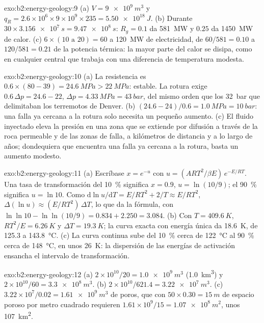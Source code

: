 \begin{solution}{exo:b2:energy-geology:9}
(a) $V = \qty{9e9}{m^3}$ y $q_R = 2.6 \times 10^6 \times 9 \times 10^9 \times 235 =
\qty{5.50e18}{J}$. (b) Durante $30 \times \qty{3.156e7}{s} = \qty{9.47e8}{s}$: $R_g = 0.1$ da
\qty{581}{MW} y $0.25$ da \qty{1450}{MW} de calor. (c) $6 \times (10 \text{ a } 20) = 60$ a
\qty{120}{MW} de electricidad, de $60/581 = 0.10$ a $120/581 = 0.21$ de la potencia térmica: la mayor parte del
calor se disipa, como en cualquier central que trabaja con una diferencia de temperatura modesta.
\end{solution}

\begin{solution}{exo:b2:energy-geology:10}
(a) La resistencia es $0.6 \times (80 - 39) = \qty{24.6}{MPa} > \qty{22}{MPa}$: estable. La rotura exige
$0.6\,\Delta p = 24.6 - 22$, $\Delta p = \qty{4.33}{MPa} = \qty{43}{bar}$, del mismo orden que los
\qty{32}{bar} que delimitaban los terremotos de Denver. (b) $(24.6 - 24)/0.6 = \qty{1.0}{MPa} =
\qty{10}{bar}$: una falla ya cercana a la rotura solo necesita un pequeño aumento. (c) El fluido inyectado eleva
la presión en una zona que se extiende por difusión a través de la roca permeable y de las zonas de falla, a kilómetros
de distancia y a lo largo de años; dondequiera que encuentra una falla ya cercana a la rotura, basta un aumento modesto.
\end{solution}

\begin{solution}{exo:b2:energy-geology:11}
(a) Escríbase $x = e^{-u}$ con $u = (ART^2/\beta E)\,e^{-E/RT}$. Una tasa de transformación del
\qty{10}{\percent} significa $x = 0.9$, $u = \ln(10/9)$; el \qty{90}{\percent} significa $u = \ln 10$. Como
$\mathrm{d}\ln u/\mathrm{d}T = E/RT^2 + 2/T \approx E/RT^2$, $\Delta(\ln u) \approx (E/RT^2)\,\Delta T$,
lo que da la fórmula, con $\ln\ln 10 - \ln\ln(10/9) = 0.834 + 2.250 = 3.084$. (b) Con $T =
\qty{409.6}{K}$, $RT^2/E = \qty{6.26}{K}$ y $\Delta T = \qty{19.3}{K}$; la curva exacta con energía única
da \qty{18.6}{K}, de 125.3 a \qty{143.8}{\celsius}. (c) La curva continua sube del
\qty{10}{\percent} cerca de \qty{122}{\celsius} al \qty{90}{\percent} cerca de \qty{148}{\celsius}, en unos
\qty{26}{K}: la dispersión de las energías de activación ensancha el intervalo de transformación.
\end{solution}

\begin{solution}{exo:b2:energy-geology:12}
(a) $2 \times 10^{10}/20 = \qty{1.0e9}{m^3}$ (\qty{1.0}{km^3}) y $2 \times 10^{10}/60 =
\qty{3.3e8}{m^3}$. (b) $2 \times 10^{10}/621.4 = \qty{3.22e7}{m^3}$. (c) $3.22 \times 10^7/0.02 =
\qty{1.61e9}{m^3}$ de poros, que con $50 \times 0.30 = \qty{15}{m}$ de espacio poroso por metro
cuadrado requieren $1.61 \times 10^9/15 = \qty{1.07e8}{m^2}$, unos \qty{107}{km^2}.
\end{solution}

